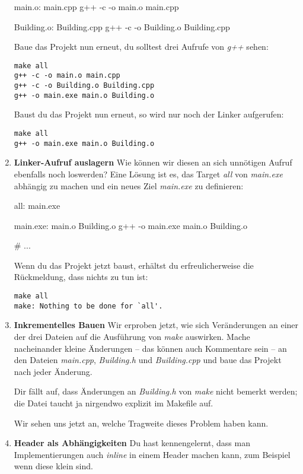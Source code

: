 \documentclass[
  accentcolor=tud1c,	%
  colorbacktitle,		%
  inverttitle,			%
  german,				%
  twoside
]{tudexercise}
\begin{document}
\begin{enumerate}
\begin{lstmake}
main.o: main.cpp
	g++ -c -o main.o main.cpp

Building.o: Building.cpp
	g++ -c -o Building.o Building.cpp
\end{lstmake}

Baue das Projekt nun erneut, du solltest drei Aufrufe von \emph{g++} sehen:
\begin{verbatim}
make all 
g++ -c -o main.o main.cpp
g++ -c -o Building.o Building.cpp
g++ -o main.exe main.o Building.o
\end{verbatim}
Baust du das Projekt nun erneut, so wird nur noch der Linker aufgerufen:
\begin{verbatim}
make all 
g++ -o main.exe main.o Building.o
\end{verbatim}

\item\textbf{Linker-Aufruf auslagern}
Wie können wir diesen an sich unnötigen Aufruf ebenfalls noch loswerden?
Eine Lösung ist es, das Target \emph{all} von \emph{main.exe} abhängig zu machen und ein neues Ziel \emph{main.exe} zu definieren:
\begin{lstmake}
all: main.exe

main.exe: main.o Building.o
	g++ -o main.exe main.o Building.o

# ...
\end{lstmake}

Wenn du das Projekt jetzt baust, erhältst du erfreulicherweise die Rückmeldung, dass nichts zu tun ist:
\begin{verbatim}
make all 
make: Nothing to be done for `all'.
\end{verbatim}

\item\textbf{Inkrementelles Bauen}
Wir erproben jetzt, wie sich Veränderungen an einer der drei Dateien auf die Ausführung von \emph{make} auswirken.
Mache nacheinander kleine Änderungen -- das können auch Kommentare sein -- an den Dateien \emph{main.cpp}, \emph{Building.h} und \emph{Building.cpp} und baue das Projekt nach jeder Änderung.

Dir fällt auf, dass Änderungen an \emph{Building.h} von \emph{make} nicht bemerkt werden; die Datei taucht ja nirgendwo explizit im Makefile auf.

Wir sehen uns jetzt an, welche Tragweite dieses Problem haben kann.


\item\textbf{Header als Abhängigkeiten}
Du hast kennengelernt, dass man Implementierungen auch \emph{inline} in einem Header machen kann, zum Beispiel wenn diese klein sind.


\end{enumerate}
\end{document}
